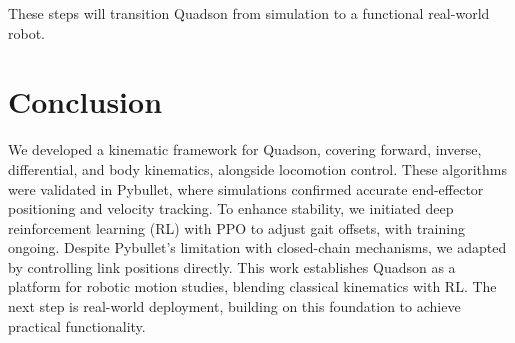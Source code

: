 \documentclass[a4paper,11pt]{article}
\begin{document}
These steps will transition Quadson from simulation to a functional real-world robot.

\section{Conclusion}

We developed a kinematic framework for Quadson, covering forward, inverse, differential, and body kinematics, alongside locomotion control. These algorithms were validated in Pybullet, where simulations confirmed accurate end-effector positioning and velocity tracking. 
To enhance stability, we initiated deep reinforcement learning (RL) with PPO to adjust gait offsets, with training ongoing. Despite Pybullet's limitation with closed-chain mechanisms, we adapted by controlling link positions directly. This work establishes Quadson as a platform for robotic motion studies, 
blending classical kinematics with RL. The next step is real-world deployment, building on this foundation to achieve practical functionality.
\end{document}
